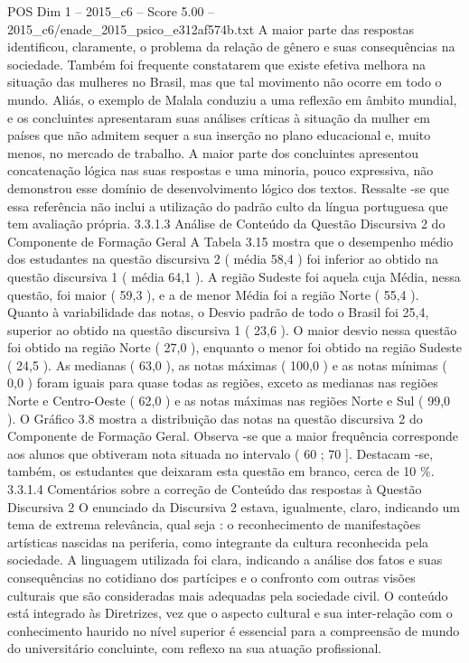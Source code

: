 \begin{textsample}{POS Dim 1 – 2015\_c6 – Score 5.00 – 2015\_c6/enade\_2015\_psico\_e312af574b.txt}
A maior parte das respostas identificou, claramente, o problema da relação de gênero e suas consequências na sociedade.
Também foi frequente constatarem que existe efetiva melhora na situação das mulheres no Brasil, mas que tal movimento não ocorre em todo o mundo.
Aliás, o exemplo de Malala conduziu a uma reflexão em âmbito mundial, e os concluintes apresentaram suas análises críticas à situação da mulher em países que não admitem sequer a sua inserção no plano educacional e, muito menos, no mercado de trabalho.
A maior parte dos concluintes apresentou concatenação lógica nas suas respostas e uma minoria, pouco expressiva, não demonstrou esse domínio de desenvolvimento lógico dos textos.
Ressalte -se que essa referência não inclui a utilização do padrão culto da língua portuguesa que tem avaliação própria. 3.3.1.3 Análise de Conteúdo da Questão Discursiva 2 do Componente de Formação Geral A Tabela 3.15 mostra que o desempenho médio dos estudantes na questão discursiva 2 ( média 58,4 ) foi inferior ao obtido na questão discursiva 1 ( média 64,1 ).
A região Sudeste foi aquela cuja Média, nessa questão, foi maior ( 59,3 ), e a de menor Média foi a região Norte ( 55,4 ).
Quanto à variabilidade das notas, o Desvio padrão de todo o Brasil foi 25,4, superior ao obtido na questão discursiva 1 ( 23,6 ).
O maior desvio nessa questão foi obtido na região Norte ( 27,0 ), enquanto o menor foi obtido na região Sudeste ( 24,5 ).
As medianas ( 63,0 ), as notas máximas ( 100,0 ) e as notas mínimas ( 0,0 ) foram iguais para quase todas as regiões, exceto as medianas nas regiões Norte e Centro-Oeste ( 62,0 ) e as notas máximas nas regiões Norte e Sul ( 99,0 ).
O Gráfico 3.8 mostra a distribuição das notas na questão discursiva 2 do Componente de Formação Geral.
Observa -se que a maior frequência corresponde aos alunos que obtiveram nota situada no intervalo ( 60 ; 70 ].
Destacam -se, também, os estudantes que deixaram esta questão em branco, cerca de 10 \%. 3.3.1.4 Comentários sobre a correção de Conteúdo das respostas à Questão Discursiva 2 O enunciado da Discursiva 2 estava, igualmente, claro, indicando um tema de extrema relevância, qual seja : o reconhecimento de manifestações artísticas nascidas na periferia, como integrante da cultura reconhecida pela sociedade.
A linguagem utilizada foi clara, indicando a análise dos fatos e suas consequências no cotidiano dos partícipes e o confronto com outras visões culturais que são consideradas mais adequadas pela sociedade civil.
O conteúdo está integrado às Diretrizes, vez que o aspecto cultural e sua inter-relação com o conhecimento haurido no nível superior é essencial para a compreensão de mundo do universitário concluinte, com reflexo na sua atuação profissional.

\end{textsample}
